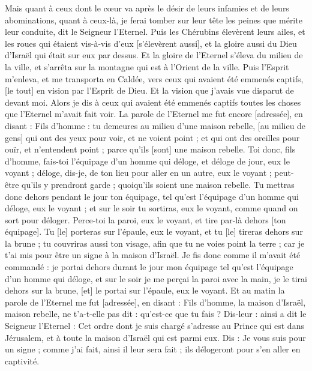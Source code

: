 \begin{multicols}{2}
Mais quant à ceux dont le cœur va après le désir de leurs infamies et de leurs abominations, quant à ceux-là, je ferai tomber sur leur tête les peines que mérite leur conduite, dit le Seigneur l'Eternel.
Puis les Chérubins élevèrent leurs ailes, et les roues qui étaient vis-à-vis d'eux [s'élevèrent aussi], et la gloire aussi du Dieu d'Israël qui était sur eux par dessus.
Et la gloire de l'Eternel s'éleva du milieu de la ville, et s'arrêta sur la montagne qui est à l'Orient de la ville.
Puis l'Esprit m'enleva, et me transporta en Caldée, vers ceux qui avaient été emmenés captifs, [le tout] en vision par l'Esprit de Dieu. Et la vision que j'avais vue disparut de devant moi.
Alors je dis à ceux qui avaient été emmenés captifs toutes les choses que l'Eternel m'avait fait voir.
\VerseOne{}La parole de l'Eternel me fut encore [adressée], en disant :
Fils d'homme : tu demeures au milieu d'une maison rebelle, [au milieu de gens] qui ont des yeux pour voir, et ne voient point ; et qui ont des oreilles pour ouïr, et n'entendent point ; parce qu'ils [sont] une maison rebelle.
Toi donc, fils d'homme, fais-toi l'équipage d'un homme qui déloge, et déloge de jour, eux le voyant ; déloge, dis-je, de ton lieu pour aller en un autre, eux le voyant ; peut-être qu'ils y prendront garde ; quoiqu'ils soient une maison rebelle.
Tu mettras donc dehors pendant le jour ton équipage, tel qu'est l'équipage d'un homme qui déloge, eux le voyant ; et sur le soir tu sortiras, eux le voyant, comme quand on sort pour déloger.
Perce-toi la paroi, eux le voyant, et tire par-là dehors [ton équipage].
Tu [le] porteras sur l'épaule, eux le voyant, et tu [le] tireras dehors sur la brune ; tu couvriras aussi ton visage, afin que tu ne voies point la terre ; car je t'ai mis pour être un signe à la maison d'Israël.
Je fis donc comme il m'avait été commandé : je portai dehors durant le jour mon équipage tel qu'est l'équipage d'un homme qui déloge, et sur le soir je me perçai la paroi avec la main, je le tirai dehors sur la brune, [et] le portai sur l'épaule, eux le voyant.
Et au matin la parole de l'Eternel me fut [adressée], en disant :
Fils d'homme, la maison d'Israël, maison rebelle, ne t'a-t-elle pas dit : qu'est-ce que tu fais ?
Dis-leur : ainsi a dit le Seigneur l'Eternel : Cet ordre dont je suis chargé s'adresse au Prince qui est dans Jérusalem, et à toute la maison d'Israël qui est parmi eux.
Dis : Je vous suis pour un signe ; comme j'ai fait, ainsi il leur sera fait ; ils délogeront pour s'en aller en captivité.

\end{multicols}
